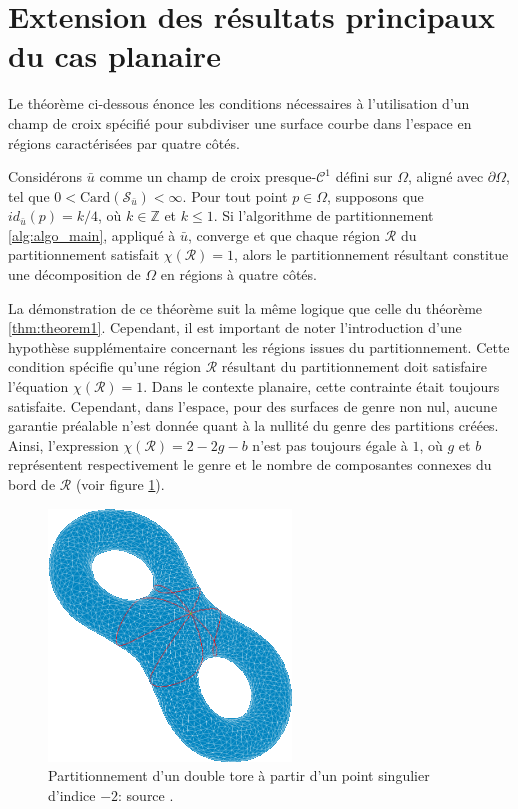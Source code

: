 \section{Extension des résultats principaux du cas planaire}

Le théorème ci-dessous énonce les conditions nécessaires à l'utilisation d'un champ de croix spécifié pour subdiviser une surface courbe dans l'espace en régions caractérisées par quatre côtés.

\begin{theorem}
\label{thm:theorem1_space}
Considérons $\bar{u}$ comme un champ de croix presque-$\mathcal{C}^1$ défini sur $\Omega$, aligné avec $\partial\Omega$, tel que $0 < \text{Card}(\mathcal{S}_{\bar{u}}) < \infty$. Pour tout point $p \in \Omega$, supposons que $id_{\bar{u}}(p) = k/4$, où $k \in \mathbb{Z}$ et $k \leq 1$. Si l'algorithme de partitionnement \ref{alg:algo_main}, appliqué à $\bar{u}$, converge et que chaque région $\mathcal{R}$ du partitionnement satisfait $\chi(\mathcal{R})=1$, alors le partitionnement résultant constitue une décomposition de $\Omega$ en régions à quatre côtés.
\end{theorem}

La démonstration de ce théorème suit la même logique que celle du théorème \ref{thm:theorem1}. Cependant, il est important de noter l'introduction d'une hypothèse supplémentaire concernant les régions issues du partitionnement. Cette condition spécifie qu'une région $\mathcal{R}$ résultant du partitionnement doit satisfaire l'équation $\chi(\mathcal{R})=1$. Dans le contexte planaire, cette contrainte était toujours satisfaite. Cependant, dans l'espace, pour des surfaces de genre non nul, aucune garantie préalable n'est donnée quant à la nullité du genre des partitions créées. Ainsi, l'expression $\chi(\mathcal{R}) = 2 - 2g - b$ n'est pas toujours égale à $1$, où $g$ et $b$ représentent respectivement le genre et le nombre de composantes connexes du bord de $\mathcal{R}$ (voir figure \ref{fig:double_tore}).

\begin{figure}[!h]
  \centering
  \includegraphics[scale=0.8]{images/double_tore.png}
  \caption{Partitionnement d'un double tore à partir d'un point singulier d'indice $-2$: source \cite{chen2018metric}.}
  \label{fig:double_tore}
\end{figure}

